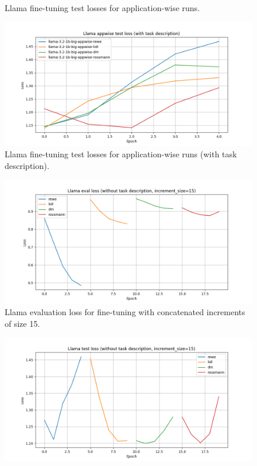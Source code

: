 \documentclass[licencjacka,en]{pracamgr}
\begin{document}
\begin{appendices}
\begin{figure}[h]
    \caption{Llama fine-tuning test losses for application-wise runs.}
    \label{fig:llama-wth-appwise}
\end{figure}
\begin{figure}[h]
    \centering
    \includegraphics[width=0.8\linewidth]{bachelor_images/llama_ft/llama-appwise-w-test.png}
    \caption{Llama fine-tuning test losses for application-wise runs (with task description).}
    \label{fig:llama-w-appwise}
\end{figure}
\begin{figure}[h]
    \centering
    \includegraphics[width=0.8\linewidth]{bachelor_images/llama_ft/llama-inc-15-tot-eval.png}
    \caption{Llama evaluation loss for fine-tuning with concatenated increments of size 15.}
    \label{fig:llama-inc-tot-15-eval}
\end{figure}
\begin{figure}[h]
    \centering
    \includegraphics[width=0.8\linewidth]{bachelor_images/llama_ft/llama-inc-15-tot-test.png}

\end{figure}
\end{appendices}
\end{document}

